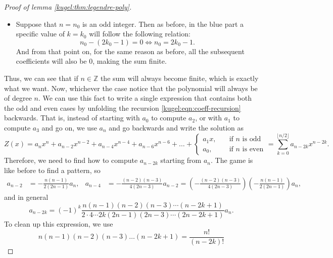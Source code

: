 \begin{proof}[Proof of lemma \ref{kugel:thm:legendre-poly}]
\begin{itemize}
    \item[\textcolor{blue!80!black}{\textbullet}]
      Suppose that $n=n_0$ is an odd integer. Then as before, in the blue part a
      specific value of $k=k_0$ will follow the following relation:
      \begin{equation*}
        n_0-(2k_0-1)=0
        \iff
        n_0 = 2k_0 - 1.
      \end{equation*}
      And from that point on, for the same reason as before, all the subsequent
      coefficients will also be 0, making the sum finite.
  \end{itemize} 

  Thus, we can see that if $n \in \mathbb{Z}$ the sum will always become finite,
  which is exactly what we want. Now, whichever the case notice that the
  polynomial will always be of degree $n$. We can use this fact to write a
  single expression that contains both the odd and even cases by unfolding the
  recursion \eqref{kugel:eqn:coeff-recursion} backwards. That is, instead of
  starting with $a_0$ to compute $a_2$, or with $a_1$ to compute $a_3$ and go
  on, we use $a_n$ and go backwards and write the solution as
  \begin{equation*}
    Z(x) = a_n x^n + a_{n-2} x^{n-2} + a_{n-4} x^{n-4} 
      + a_{n-6} x^{n-6} + \hdots +
      \begin{cases} 
        a_1 x, \quad &\text{if } n \text{ is odd} \\ 
        a_0, \quad  &\text{if } n \text{ is even} 
      \end{cases}
      = \sum_{k=0}^{\lfloor n/2 \rfloor} a_{n-2k}x^{n-2k}.
  \end{equation*}
  Therefore, we need to find how to compute $a_{n - 2k}$ starting from $a_n$.
  The game is like before to find a pattern, so
  \begin{align*}
    a_{n-2} &= -\frac{n(n-1)}{2(2n-1)}a_n, &
    a_{n-4} &= -\frac{(n-2)(n-3)}{4(2n-3)}a_{n-2}
    = \left(
        -\frac{(n-2)(n-3)}{4(2n-3)}
      \right) \left(
        -\frac{n(n-1)}{2(2n-1)}
      \right) a_n,
  \end{align*}
  and in general 
  \begin{equation*}
    a_{n-2k} = (-1)^k \frac{
      n(n-1)(n-2)(n-3) \cdots (n-2k+1)
    }{
      2 \cdot 4 \cdots 2k(2n-1)(2n-3) \cdots (2n-2k+1)
    } a_n.
  \end{equation*}
  To clean up this expression, we use
  \begin{equation*}
    n(n-1)(n-2)(n-3) \hdots (n-2k+1)
    = \frac{n!}{(n-2k)!}

\end{equation*}
\end{proof}
